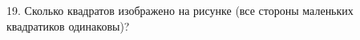 19. Сколько квадратов изображено на рисунке (все стороны маленьких квадратиков одинаковы)?
\begin{center}
\begin{figure}[ht!]
\end{figure}
\end{center}
